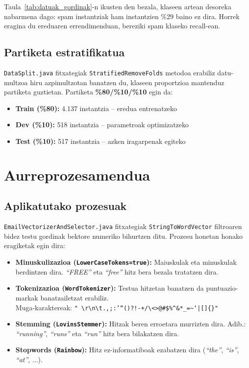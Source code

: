 \documentclass[12pt, a4paper]{article}
\begin{document}
Taula~\ref{tab:datuak_gordinak}-n ikusten den bezala, klaseen artean desoreka
nabarmena dago: spam instantziak ham instantzien \%29 baino ez dira.
Horrek eragina du ereduaren errendimenduan, bereziki spam klaseko recall-ean.

\subsection{Partiketa estratifikatua}

\texttt{DataSplit.java} fitxategiak \texttt{StratifiedRemoveFolds} metodoa erabiliz
datu-multzoa hiru azpimultzotan banatzen du, klaseen proportzioa mantenduz
partiketa guztietan. Partiketa \textbf{\%80/\%10/\%10} egin da:

\begin{itemize}
    \item \textbf{Train (\%80):} 4.137 instantzia -- eredua entrenatzeko
    \item \textbf{Dev (\%10):} 518 instantzia -- parametroak optimizatzeko
    \item \textbf{Test (\%10):} 517 instantzia -- azken iragarpenak egiteko
\end{itemize}

\newpage
\section{Aurreprozesamendua}

\subsection{Aplikatutako prozesuak}

\texttt{EmailVectorizerAndSelector.java} fitxategiak \texttt{StringToWordVector}
filtroaren bidez testu gordinak bektore numeriko bihurtzen ditu.
Prozesu honetan honako eragiketak egin dira:

\begin{itemize}
    \item \textbf{Minuskulizazioa (\texttt{LowerCaseTokens=true}):}
    Maiuskulak eta minuskulak berdintzen dira. \textit{``FREE''} eta \textit{``free''}
    hitz bera bezala tratatzen dira.
    \item \textbf{Tokenizazioa (\texttt{WordTokenizer}):}
    Testua hitzetan banatzen da puntuazio-markak banatzailetzat erabiliz. \\
    Muga-karaktereak: \texttt{" \textbackslash r\textbackslash n\textbackslash t.,;:'``()?!-+/\textbackslash<>@\#\$\%\^{}\&*\_=\textasciitilde`|[]\{\}"}
    \item \textbf{Stemming (\texttt{LovinsStemmer}):}
    Hitzak beren erroetara murrizten dira. Adib.: \textit{``running''}, \textit{``runs''}
    eta \textit{``run''} hitz bera bilakatzen dira.
    \item \textbf{Stopwords (\texttt{Rainbow}):}
    Hitz ez-informatiboak ezabatzen dira (\textit{``the''}, \textit{``is''}, \textit{``at''}, ...).
\end{itemize}
\end{document}
